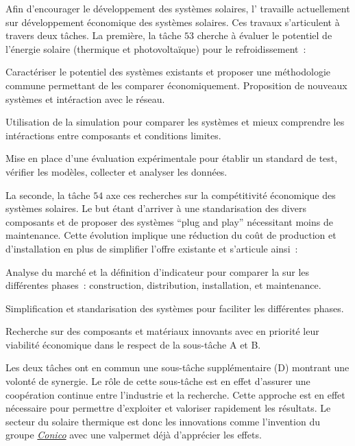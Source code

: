 Afin d’encourager le développement des systèmes solaires, l’ travaille
actuellement sur développement économique des systèmes solaires. Ces travaux s’articulent
à travers deux tâches. La première, la tâche $53$ cherche à évaluer le potentiel
de l’énergie solaire (thermique et photovoltaïque) pour le refroidissement~:
\begin{description}[align=left]
    \item [A~:] Caractériser le potentiel des systèmes existants et proposer une méthodologie
                commune permettant de les comparer économiquement. Proposition de nouveaux
                systèmes et intéraction avec le réseau.
    \item [B~:] Utilisation de la simulation pour comparer les systèmes et mieux
                comprendre les intéractions entre composants et conditions limites.
    \item [C~:] Mise en place d’une évaluation expérimentale pour établir un standard
                de test, vérifier les modèles, collecter et analyser les données.
\end{description}
La seconde, la tâche $54$ axe ces recherches sur la compétitivité économique des
systèmes solaires. Le but étant d’arriver à une standarisation des
divers composants et de proposer des systèmes \enquote{plug and play} nécessitant
moins de maintenance. Cette évolution implique une réduction du coût de production
et d’installation en plus de simplifier l’offre existante et s’articule ainsi~:
\begin{description}[align=left]
    \item [A~:] Analyse du marché et la définition d’indicateur pour comparer la
                sur les différentes phases~: construction, distribution, installation, et maintenance.
    \item [B~:] Simplification et standarisation des systèmes pour faciliter les différentes
                phases.
    \item [C~:] Recherche sur des composants et matériaux innovants avec en priorité
                leur viabilité économique dans le respect de la sous-tâche A et B.
\end{description}
Les deux tâches ont en commun une sous-tâche supplémentaire (D) montrant une volonté
de synergie. Le rôle de cette sous-tâche est en effet d’assurer une coopération
continue entre l’industrie et la recherche. Cette approche est en effet nécessaire
pour permettre d’exploiter et valoriser rapidement les résultats.
Le secteur du solaire thermique est donc les innovations
comme l’invention du groupe \href{http://www.iea-shc.org/article?NewsID=177}{\textit{Conico}}
avec une valpermet déjà d’apprécier les effets.

